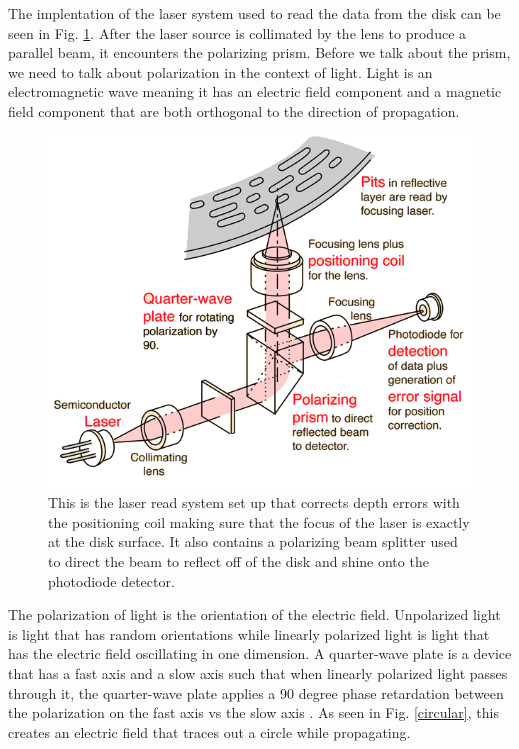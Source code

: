 \documentclass[ notitlepage, numerical, 11pt]{revtex4-1} %
\begin{document}
The implentation of the laser system used to read the data from the disk can be seen in Fig. \ref{cdPlay}. After the laser source is collimated by the lens to produce a parallel beam, it encounters the polarizing prism. Before we talk about the prism, we need to talk about polarization in the context of light. Light is an electromagnetic wave meaning it has an electric field component and a magnetic field component that are both orthogonal to the direction of propagation. 
\begin{figure}[H]
\centerline{\includegraphics[scale=.6]{cdPlay.png}}
\caption{This is the laser read system set up that corrects depth errors with the positioning coil making sure that the focus of the laser is exactly at the disk surface. It also contains a polarizing beam splitter used to direct the beam to reflect off of the disk and shine onto the photodiode detector\cite{hyper}.}
\label{cdPlay}
\end{figure} 
The polarization of light is the orientation of the electric field. Unpolarized light is light that has random orientations while linearly polarized light is light that has the electric field oscillating in one dimension. A quarter-wave plate is a device that has a fast axis and a slow axis such that when linearly polarized light passes through it, the quarter-wave plate applies a 90 degree phase retardation between the polarization on the fast axis vs the slow axis \cite{optics}. As seen in Fig. \ref{circular}, this creates an electric field that traces out a circle while propagating.
\end{document}
